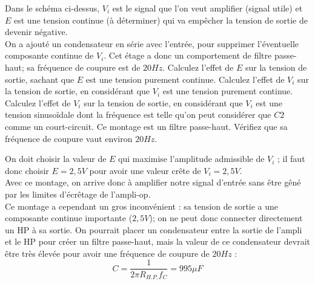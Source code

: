 \documentclass{../template/labo}
\begin{document}
Dans le schéma ci-dessus, $V_i$ est le signal que l'on veut amplifier (signal utile) et $E$ est une tension continue (à déterminer) qui va empêcher la tension de sortie de devenir négative.\\
On a ajouté un condensateur en série avec l'entrée, pour supprimer l'éventuelle composante continue de $V_i$. Cet étage a donc un comportement de filtre passe-haut; sa fréquence de coupure est de $20Hz$.
\Question
{
Calculez l'effet de $E$ sur la tension de sortie, sachant que $E$ est une tension purement continue.
}
{}
\Question
{
Calculez l'effet de $V_i$ sur la tension de sortie, en considérant que $V_i$ est une tension purement continue.
}
{}
\Question
{
Calculez l'effet de $V_i$ sur la tension de sortie, en considérant que $V_i$ est une tension sinusoïdale dont la fréquence est telle qu'on peut considérer que $C2$ comme un court-circuit.
}
{}
\Question
{
Ce montage est un filtre passe-haut. Vérifiez que sa fréquence de coupure vaut environ $20Hz$.
}
{}

On doit choisir la valeur de $E$ qui maximise l'amplitude admissible de $V_i$ ; il faut donc choisir $E = 2,5V$ pour avoir une valeur crête de $V_i = 2,5V$.\\
Avec ce montage, on arrive donc à amplifier notre signal d'entrée sans être gêné par les limites d'écrêtage de l'ampli-op.\\
Ce montage a cependant un gros inconvénient : sa tension de sortie a une composante continue importante ($2,5V$); on ne peut donc connecter directement un HP à sa sortie. On pourrait placer un condensateur entre la sortie de l'ampli et le HP pour créer un filtre passe-haut, mais la valeur de ce condensateur devrait être très élevée pour avoir une fréquence de coupure de $20Hz$ :
$$C=  \frac{1}{2 \pi R_{H.P.}f_C}=995\mu F$$
\end{document}
